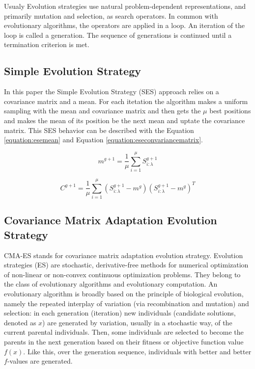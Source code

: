 Usualy Evolution strategies use natural problem-dependent representations, and primarily mutation and selection, as search operators. In common with evolutionary algorithms, the operators are applied in a loop. An iteration of the loop is called a generation. The sequence of generations is continued until a termination criterion is met.

\subsection{Simple Evolution Strategy}

In this paper the Simple Evolution Strategy (SES) approach relies on a covariance matrix and a mean. For each itetation the algorithm makes a uniform sampling with the mean and covariance matrix and then gets the $\mu$ best positions and makes the mean of its position be the next mean and uptate the covariance matrix. This SES behavior can be described with the Equation \ref{equation:esemean} and Equation \ref{equation:eseconvariancematrix}.

\begin{equation}
    \label{equation:esemean}
    m^{g+1} = \frac{1}{\mu} \sum_{i=1}^{\mu} S_{i:\lambda}^{g+1}
\end{equation}

\begin{equation}
    \label{equation:eseconvariancematrix}
    C^{g+1} = \frac{1}{\mu} \sum_{i=1}^{\mu} (S_{i:\lambda}^{g+1} - m^g) (S_{i:\lambda}^{g+1} - m^g)^T
\end{equation}

\subsection{Covariance Matrix Adaptation Evolution Strategy}

CMA-ES stands for covariance matrix adaptation evolution strategy. Evolution strategies (ES) are stochastic, derivative-free methods for numerical optimization of non-linear or non-convex continuous optimization problems. They belong to the class of evolutionary algorithms and evolutionary computation. An evolutionary algorithm is broadly based on the principle of biological evolution, namely the repeated interplay of variation (via recombination and mutation) and selection: in each generation (iteration) new individuals (candidate solutions, denoted as $x$) are generated by variation, usually in a stochastic way, of the current parental individuals. Then, some individuals are selected to become the parents in the next generation based on their fitness or objective function value $f(x)$. Like this, over the generation sequence, individuals with better and better $f$-values are generated.

